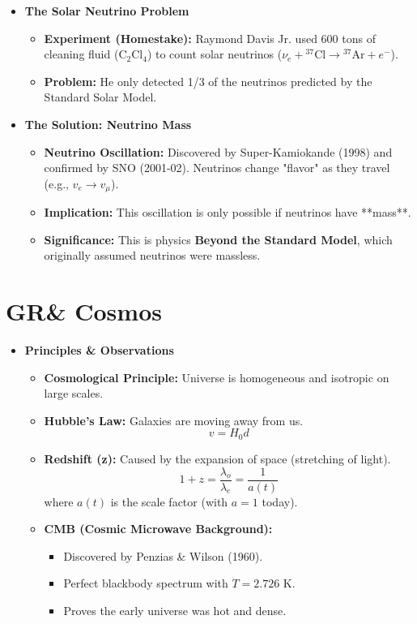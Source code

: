 \documentclass{sciposter}
\begin{document}
\begin{multicols}{3}
\begin{itemize}
    \item \textbf{The Solar Neutrino Problem}
    \begin{itemize}
        \item \textbf{Experiment (Homestake):} Raymond Davis Jr. used 600 tons of cleaning fluid ($\text{C}_2\text{Cl}_4$) to count solar neutrinos ($\nu_e + {}^{37}\text{Cl} \rightarrow {}^{37}\text{Ar} + e^-$).
        \item \textbf{Problem:} He only detected 1/3 of the neutrinos predicted by the Standard Solar Model.
    \end{itemize}

    \item \textbf{The Solution: Neutrino Mass}
    \begin{itemize}
        \item \textbf{Neutrino Oscillation:} Discovered by Super-Kamiokande (1998) and confirmed by SNO (2001-02). Neutrinos change "flavor" as they travel (e.g., $v_e \rightarrow v_\mu$).
        \item \textbf{Implication:} This oscillation is only possible if neutrinos have **mass**.
        \item \textbf{Significance:} This is physics \textbf{Beyond the Standard Model}, which originally assumed neutrinos were massless.
    \end{itemize}
\end{itemize}

\section{GR\& Cosmos}


\begin{itemize}
    \item \textbf{Principles \& Observations}
    \begin{itemize}
        \item \textbf{Cosmological Principle:} Universe is homogeneous and isotropic on large scales.
        \item \textbf{Hubble's Law:} Galaxies are moving away from us.
        $$v = H_0 d$$
        \item \textbf{Redshift (z):} Caused by the expansion of space (stretching of light).
        $$1+z = \frac{\lambda_o}{\lambda_e} = \frac{1}{a(t)}$$
        where $a(t)$ is the scale factor (with $a=1$ today).
        \item \textbf{CMB (Cosmic Microwave Background):}
        \begin{itemize}
            \item Discovered by Penzias \& Wilson (1960).
            \item Perfect blackbody spectrum with $T = 2.726 \text{ K}$.
            \item Proves the early universe was hot and dense.
        \end{itemize}
    \end{itemize}


\end{itemize}
\end{multicols}
\end{document}
